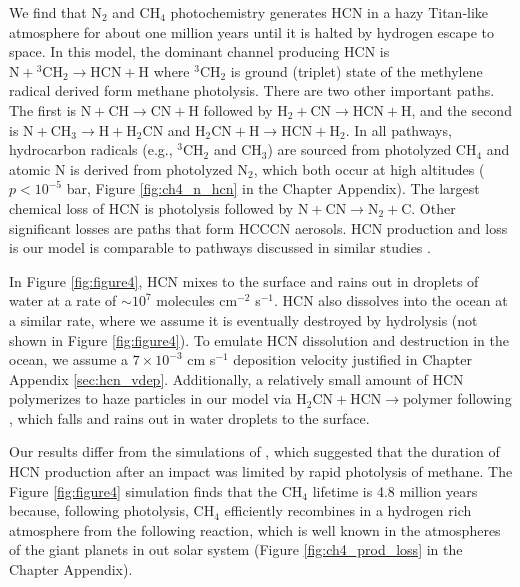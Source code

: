 We find that N$_2$ and CH$_4$ photochemistry generates HCN in a hazy Titan-like atmosphere for about one million years until it is halted by hydrogen escape to space. In this model, the dominant channel producing HCN is $\mathrm{N} + \mathrm{^3CH_2} \rightarrow \mathrm{HCN} + \mathrm{H}$ where $\mathrm{^3CH_2}$ is ground (triplet) state of the methylene radical derived form methane photolysis. There are two other important paths. The first is $\mathrm{N} + \mathrm{CH} \rightarrow \mathrm{CN} + \mathrm{H}$ followed by $\mathrm{H_2} + \mathrm{CN} \rightarrow \mathrm{HCN} + \mathrm{H}$, and the second is $\mathrm{N} + \mathrm{CH_3} \rightarrow \mathrm{H} + \mathrm{H_2CN}$ and $\mathrm{H_2CN} + \mathrm{H} \rightarrow \mathrm{HCN} + \mathrm{H_2}$. In all pathways, hydrocarbon radicals (e.g., $\mathrm{^3CH_2}$ and $\mathrm{CH_3}$) are sourced from photolyzed CH$_4$ and atomic N is derived from photolyzed N$_2$, which both occur at high altitudes ($p < 10^{-5}$ bar, Figure \ref{fig:ch4_n_hcn} in the Chapter Appendix). The largest chemical loss of HCN is photolysis followed by $\mathrm{N} + \mathrm{CN} \rightarrow \mathrm{N_2} + \mathrm{C}$. Other significant losses are paths that form HCCCN aerosols. HCN production and loss is our model is comparable to pathways discussed in similar studies \citep{Zahnle_1986,Tian_2011,Rimmer_2019}.

In Figure \ref{fig:figure4}, HCN mixes to the surface and rains out in droplets of water at a rate of $\sim 10^7$ molecules cm$^{-2}$ s$^{-1}$. HCN also dissolves into the ocean at a similar rate, where we assume it is eventually destroyed by hydrolysis (not shown in Figure \ref{fig:figure4}). To emulate HCN dissolution and destruction in the ocean, we assume a $7 \times 10^{-3}$ cm s$^{-1}$ deposition velocity justified in Chapter Appendix \ref{sec:hcn_vdep}. Additionally, a relatively small amount of HCN polymerizes to haze particles in our model via $\mathrm{H_2CN} + \mathrm{HCN} \rightarrow \mathrm{polymer}$ following \citet{Lavvas_2008}, which falls and rains out in water droplets to the surface.

Our results differ from the simulations of \citet{Zahnle_2020}, which suggested that the duration of HCN production after an impact was limited by rapid photolysis of methane. The Figure \ref{fig:figure4} simulation finds that the CH$_4$ lifetime is 4.8 million years because, following photolysis, CH$_4$ efficiently recombines in a hydrogen rich atmosphere from the following reaction, which is well known in the atmospheres of the giant planets in out solar system (Figure \ref{fig:ch4_prod_loss} in the Chapter Appendix).

